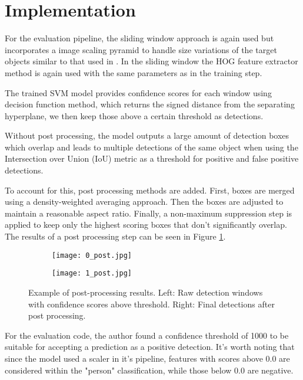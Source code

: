 \section{Implementation}

For the evaluation pipeline, the sliding window approach is again used but incorporates a image scaling pyramid to handle size variations of the target objects similar to that used in \cite{plvs2023hogdetection}.
In the sliding window the HOG feature extractor method is again used with the same parameters as in the training step.

The  trained SVM model provides confidence scores for each window using decision function method, which returns the signed distance from the separating hyperplane, we then keep those above a certain threshold as detections.

Without post processing, the model outputs a large amount of detection boxes which overlap and leads to multiple detections of the same object when using the Intersection over Union (IoU) metric as a threshold for positive and false positive detections.

To account for this, post processing methods are added. 
First, boxes are merged using a density-weighted averaging approach.
Then the boxes are adjusted to maintain a reasonable aspect ratio.
Finally, a non-maximum suppression step is applied to keep only the highest scoring boxes that don't significantly overlap.
The results of a post processing step can be seen in Figure \ref{fig:post_process}.

\begin{figure}[htbp]
    \centering
    \begin{subfigure}{0.48\textwidth}
        \texttt{[image: 0\_post.jpg]}
    \end{subfigure}
    \hfill
    \begin{subfigure}{0.48\textwidth}
        \texttt{[image: 1\_post.jpg]}
    \end{subfigure}
    \caption{Example of post-processing results. Left: Raw detection windows with confidence scores above threshold. Right: Final detections after post processing.}
    \label{fig:post_process}
\end{figure}

For the evaluation code, the author found a confidence threshold of 1000 to be suitable for accepting a prediction as a positive detection.
It's worth noting that since the model used a scaler in it's pipeline, features with scores above 0.0 are considered within the "person" classification, while those below  0.0 are negative.